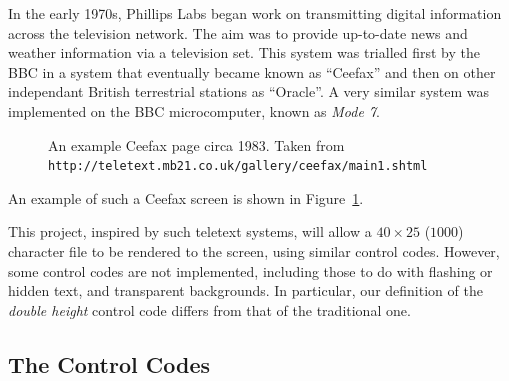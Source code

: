 


In the early 1970s, Phillips Labs began work on transmitting digital
information across the television network. The aim was to
provide up-to-date news and weather information via a television set. 
This system was trialled first by the BBC in a system that eventually became
known as ``Ceefax'' and then on other independant British terrestrial stations as ``Oracle''.
A very similar system was implemented on the BBC microcomputer, known as {\it Mode 7}.
\begin{figure}[ht]
\caption{An example Ceefax page circa 1983. Taken from {\tt http://teletext.mb21.co.uk/gallery/ceefax/main1.shtml}}
\label{fig:tt100}
\end{figure}
An example of such a Ceefax screen is shown in Figure~\ref{fig:tt100}.

This project, inspired by such teletext systems, will allow a $40 \times 25$ ($1000$) character
file to be rendered to the screen, using similar control codes. However, some control
codes are not implemented, including those to do with flashing or hidden text, and transparent backgrounds. In particular, our definition of the {\it double height} control code differs from that of
the traditional one.

\subsection*{The Control Codes}

